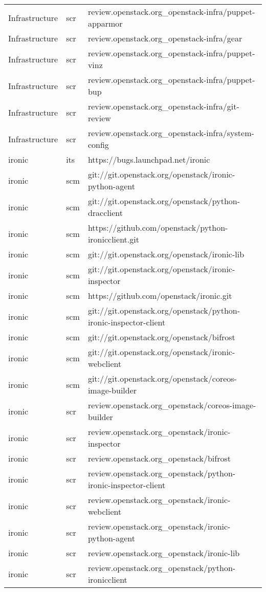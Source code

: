 \begin{center}
\begin{longtable}{|p{4cm}|p{1cm}|p{10cm}|}
Infrastructure&scr&review.openstack.org\_openstack-infra/puppet-apparmor\\ 
Infrastructure&scr&review.openstack.org\_openstack-infra/gear\\ 
Infrastructure&scr&review.openstack.org\_openstack-infra/puppet-vinz\\ 
Infrastructure&scr&review.openstack.org\_openstack-infra/puppet-bup\\ 
Infrastructure&scr&review.openstack.org\_openstack-infra/git-review\\ 
Infrastructure&scr&review.openstack.org\_openstack-infra/system-config\\ 
ironic&its&https://bugs.launchpad.net/ironic\\ 
ironic&scm&git://git.openstack.org/openstack/ironic-python-agent\\ 
ironic&scm&git://git.openstack.org/openstack/python-dracclient\\ 
ironic&scm&https://github.com/openstack/python-ironicclient.git\\ 
ironic&scm&git://git.openstack.org/openstack/ironic-lib\\ 
ironic&scm&git://git.openstack.org/openstack/ironic-inspector\\ 
ironic&scm&https://github.com/openstack/ironic.git\\ 
ironic&scm&git://git.openstack.org/openstack/python-ironic-inspector-client\\ 
ironic&scm&git://git.openstack.org/openstack/bifrost\\ 
ironic&scm&git://git.openstack.org/openstack/ironic-webclient\\ 
ironic&scm&git://git.openstack.org/openstack/coreos-image-builder\\ 
ironic&scr&review.openstack.org\_openstack/coreos-image-builder\\ 
ironic&scr&review.openstack.org\_openstack/ironic-inspector\\ 
ironic&scr&review.openstack.org\_openstack/bifrost\\ 
ironic&scr&review.openstack.org\_openstack/python-ironic-inspector-client\\ 
ironic&scr&review.openstack.org\_openstack/ironic-webclient\\ 
ironic&scr&review.openstack.org\_openstack/ironic-python-agent\\ 
ironic&scr&review.openstack.org\_openstack/ironic-lib\\ 
ironic&scr&review.openstack.org\_openstack/python-ironicclient\\ 

\end{longtable}
\end{center}
